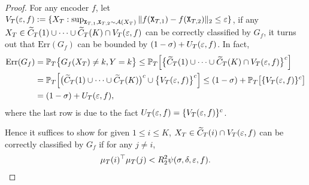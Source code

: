 \begin{proof}
For any encoder $f$, let $V_T(\varepsilon, f):= \{X_T: \sup_{\mathtt{X}_{T,1}, \mathtt{X}_{T,2} \sim \mathcal{A}(X_T)} \Vert{f(\mathtt{X}_{T,1}) - f(\mathtt{X}_{T,2})}\Vert_2 \leq \varepsilon\}$, if any $X_T \in \widetilde{C}_T(1) \cup \cdots \cup \widetilde{C}_T(K)\cap V_T(\varepsilon, f)$ can be correctly classified by $G_f$, it turns out that $\mathrm{Err}(G_f)$ can be bounded by $(1 - \sigma) + U_T(\varepsilon, f)$. In fact,
\begin{align*}
\mathrm{Err}(G_f) &= \mathbb{P}_T\big\{G_f(X_T) \neq k, Y = k\big\} \leq \mathbb{P}_T\Big[\big\{\widetilde{C}_T(1) \cup \cdots \cup \widetilde{C}_T(K) \cap V_T(\varepsilon, f)\big\}^c\Big] \\
&= \mathbb{P}_T\Big[\big(\widetilde{C}_T(1) \cup \cdots \cup \widetilde{C}_T(K)\big)^c \cup \big\{V_T(\varepsilon, f)\big\}^c\Big] \leq (1 - \sigma) + \mathbb{P}_T\big[\{V_T(\varepsilon, f)\}^c\big] \\
&= (1 - \sigma) + U_T(\varepsilon, f),
\end{align*}
where the last row is due to the fact $U_T(\varepsilon, f) = \{V_T(\varepsilon, f)\}^c$.

Hence it suffices to show for given $1 \leq i \leq K$, $X_T \in \widetilde{C}_T(i) \cap V_T(\varepsilon, f)$ can be correctly classified by $G_f$ if for any $j \neq i$,
\begin{align*}
\mu_T(i)^\top\mu_T(j) < R_2^2\psi(\sigma, \delta, \varepsilon, f).
\end{align*}


\end{proof}
